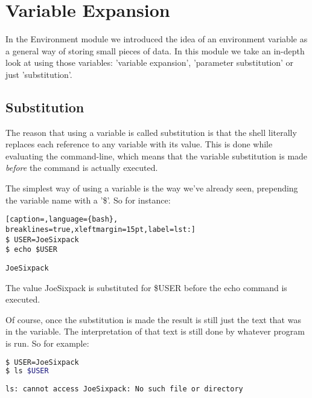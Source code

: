 \section{Variable Expansion}
In the Environment module we introduced the idea of an environment variable as
a general way of storing small pieces of data. In this module we take an
in-depth look at using those variables: 'variable expansion', 'parameter
substitution' or just 'substitution'.

\subsection{Substitution}
The reason that using a variable is called substitution is that the shell
literally replaces each reference to any variable with its value. This is done
while evaluating the command-line, which means that the variable substitution
is made \emph{before} the command is actually executed.

The simplest way of using a variable is the way we've already seen, prepending
the variable name with a '\$'. So for instance:
\lstset{basicstyle=\scriptsize, numbers=left, captionpos=b, tabsize=4}
\begin{lstlisting}[caption=,language={bash},
breaklines=true,xleftmargin=15pt,label=lst:]
$ USER=JoeSixpack
$ echo $USER
\end{lstlisting}

\scriptsize
\begin{verbatim}
JoeSixpack
\end{verbatim}
\normalsize

The value JoeSixpack is substituted for \$USER before the echo command is
executed.

Of course, once the substitution is made the result is still just the text that
was in the variable. The interpretation of that text is still done by whatever
program is run. So for example:

\lstset{basicstyle=\scriptsize, numbers=left, captionpos=b, tabsize=4}
\begin{lstlisting}[caption=Variables do not make magic,language={bash},
breaklines=true,xleftmargin=15pt,label=lst:Variables do not make magic]
$ USER=JoeSixpack
$ ls $USER
\end{lstlisting}

\scriptsize
\begin{verbatim}
ls: cannot access JoeSixpack: No such file or directory
\end{verbatim}
\normalsize

